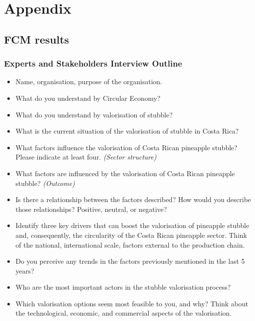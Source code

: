 \chapter{Appendix}

\renewcommand{\thesection}{A\arabic{section}}
\renewcommand\thefigure{A\arabic{section}.\arabic{figure}}  
\renewcommand\thetable{A\arabic{section}.\arabic{table}}  

\section{FCM results}

\subsection{Experts and Stakeholders Interview Outline}
\label{interviewOutline}

\begin{itemize}

\item Name, organisation, purpose of the organisation.
\item What do you understand by Circular Economy?
\item What do you understand by valorisation of stubble?
\item What is the current situation of the valorisation of stubble in Costa Rica?
\item What factors influence the valorisation of Costa Rican pineapple stubble? Please indicate at least four. \textit{(Sector structure)}
\item What factors are influenced by the valorisation of Costa Rican pineapple stubble? \textit{(Outcome)}
\item Is there a relationship between the factors described? How would you describe those relationships? Positive, neutral, or negative?
\item Identify three key drivers that can boost the valorisation of pineapple stubble and, consequently, the circularity of the Costa Rican pineapple sector. Think of the national, international scale, factors external to the production chain.
\item Do you perceive any trends in the factors previously mentioned in the last 5 years?
\item Who are the most important actors in the stubble valorisation process?
\item Which valorisation options seem most feasible to you, and why? Think about the technological, economic, and commercial aspects of the valorisation.

\end{itemize}



